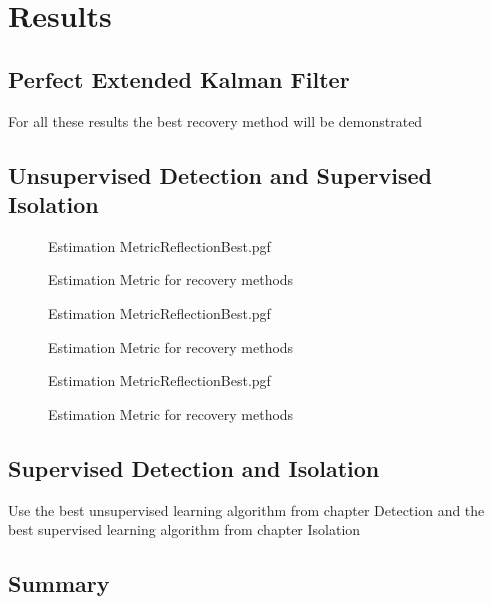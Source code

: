 \chapter{Results}
\label{chap:Results}


\section{Perfect Extended Kalman Filter}
For all these results the best recovery method will be demonstrated

\section{Unsupervised Detection and Supervised Isolation}
\begin{figure}[!htb]
	\centering
	{Estimation MetricReflectionBest.pgf}
	
	\caption{Estimation Metric for recovery methods}
	\label{fig:RecoveryComparisonMagnetic}
\end{figure}

\begin{figure}[!htb]
	\centering
	{Estimation MetricReflectionBest.pgf}
	
	\caption{Estimation Metric for recovery methods}
	\label{fig:RecoveryComparisonMagnetic}
\end{figure}

\begin{figure}[!htb]
	\centering
	{Estimation MetricReflectionBest.pgf}
	
	\caption{Estimation Metric for recovery methods}
	\label{fig:RecoveryComparisonMagnetic}
\end{figure}

\section{Supervised Detection and Isolation}
Use the best unsupervised learning algorithm from chapter Detection and the best supervised learning algorithm from chapter Isolation

\section{Summary}